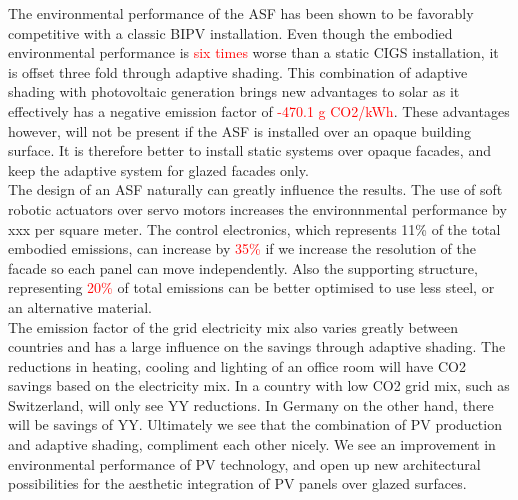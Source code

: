 
The environmental performance of the ASF has been shown to be favorably competitive with a classic BIPV installation. Even though the embodied environmental performance is \textcolor{red}{six times} worse than a static CIGS installation, it is offset three fold through adaptive shading. This combination of adaptive shading with photovoltaic generation brings new advantages to solar as it effectively has a negative emission factor of \textcolor{red}{-470.1 g CO2/kWh}. These advantages however, will not be present if the ASF is installed over an opaque building surface. It is therefore better to install static systems over opaque facades, and keep the adaptive system for glazed facades only. \\
The design of an ASF naturally can greatly influence the results. The use of soft robotic actuators over servo motors increases the environnmental performance by xxx per square meter. The control electronics, which represents 11\% of the total embodied emissions, can increase by \textcolor{red}{35\%} if we increase the resolution of the facade so each panel can move independently. Also the supporting structure, representing \textcolor{red}{20\%} of total emissions can be better optimised to use less steel, or an alternative material. \\
The emission factor of the grid electricity mix also varies greatly between countries and has a large influence on the savings through adaptive shading. The reductions in heating, cooling and lighting of an office room will have CO2 savings based on the electricity mix. In a country with low CO2 grid mix, such as Switzerland, will only see YY reductions. In Germany on the other hand, there will be savings of YY.
Ultimately we see that the combination of PV production and adaptive shading, compliment each other nicely. We see an improvement in environmental performance of PV technology, and open up new architectural possibilities for the aesthetic integration of PV panels over glazed surfaces.


